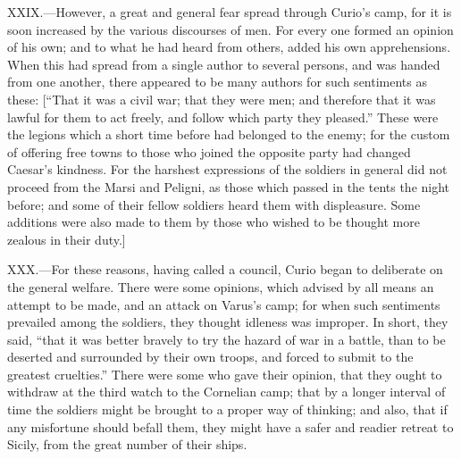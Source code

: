XXIX.—However, a great and general fear spread through Curio's camp,
for it is soon increased by the various discourses of men. For every one
formed an opinion of his own; and to what he had heard from others,
added his own apprehensions. When this had spread from a single author
to several persons, and was handed from one another, there appeared to
be many authors for such sentiments as these: [``That it was a civil war;
that they were men; and therefore that it was lawful for them to act
freely, and follow which party they pleased.'' These were the legions
which a short time before had belonged to the enemy; for the custom of
offering free towns to those who joined the opposite party had changed
Caesar's kindness. For the harshest expressions of the soldiers in
general did not proceed from the Marsi and Peligni, as those which
passed in the tents the night before; and some of their fellow soldiers
heard them with displeasure. Some additions were also made to them by
those who wished to be thought more zealous in their duty.]

XXX.—For these reasons, having called a council, Curio began to
deliberate on the general welfare. There were some opinions, which
advised by all means an attempt to be made, and an attack on Varus's
camp; for when such sentiments prevailed among the soldiers, they
thought idleness was improper. In short, they said, ``that it was better
bravely to try the hazard of war in a battle, than to be deserted and
surrounded by their own troops, and forced to submit to the greatest
cruelties.'' There were some who gave their opinion, that they ought to
withdraw at the third watch to the Cornelian camp; that by a longer
interval of time the soldiers might be brought to a proper way of
thinking; and also, that if any misfortune should befall them, they
might have a safer and readier retreat to Sicily, from the great number
of their ships.

